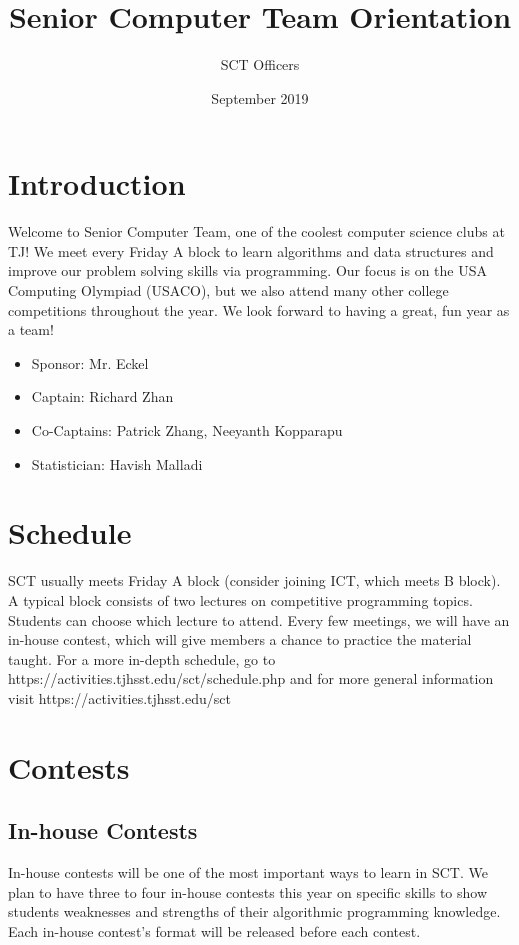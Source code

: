\documentclass[11pt]{article}
\title{Senior Computer Team Orientation}
\author{SCT Officers }
\date{September 2019}
\begin{document}
\maketitle

\section{Introduction}
    Welcome to Senior Computer Team, one of the coolest computer science clubs at TJ! We meet every Friday A block to learn algorithms and data structures and improve our problem solving skills via programming. Our focus is on the USA Computing Olympiad (USACO), but we also attend many other college competitions throughout the year. We look forward to having a great, fun year as a team! 

\begin{itemize}
  \item Sponsor: Mr. Eckel
  \item Captain: Richard Zhan
  \item Co-Captains: Patrick Zhang, Neeyanth Kopparapu
  \item Statistician: Havish Malladi
\end{itemize}

\section{Schedule}
    SCT  usually meets Friday A block (consider joining ICT, which meets B block). A typical block consists of two lectures on competitive programming topics. Students can choose which lecture to attend. Every few meetings, we will have an in-house contest, which will give members a chance to practice the material taught.
    For a more in-depth schedule, go to https://activities.tjhsst.edu/sct/schedule.php and for more general information visit https://activities.tjhsst.edu/sct

\section{Contests}
\subsection{In-house Contests}
    In-house contests will be one of the most important ways to learn in SCT. We plan to have three to four in-house contests this year on specific skills to show students weaknesses and strengths of their algorithmic programming knowledge. Each in-house contest's format will be released before each contest.
\end{document}
